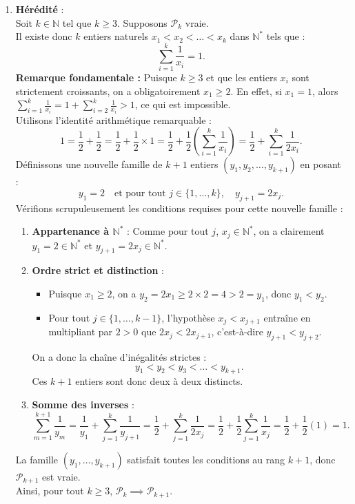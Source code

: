 \documentclass[11pt,a4paper]{article}
\newcommand{\N}{\mathbb{N}}
\begin{document}
\begin{correctionbox}
\begin{enumerate}[label=\textbf{\arabic*.}]
    \item \textbf{Hérédité} :\\
    Soit $k \in \N$ tel que $k \ge 3$. Supposons $\mathcal{P}_k$ vraie.\\
    Il existe donc $k$ entiers naturels $x_1 < x_2 < \dots < x_k$ dans $\N^*$ tels que :
    \[
    \sum_{i=1}^k \frac{1}{x_i} = 1.
    \]
    \textbf{Remarque fondamentale :} Puisque $k \ge 3$ et que les entiers $x_i$ sont strictement croissants, on a obligatoirement $x_1 \ge 2$. En effet, si $x_1 = 1$, alors $\sum_{i=1}^k \frac{1}{x_i} = 1 + \sum_{i=2}^k \frac{1}{x_i} > 1$, ce qui est impossible.\\
    Utilisons l'identité arithmétique remarquable :
    \[
    1 = \frac{1}{2} + \frac{1}{2} = \frac{1}{2} + \frac{1}{2} \times 1 = \frac{1}{2} + \frac{1}{2} \left(\sum_{i=1}^k \frac{1}{x_i}\right) = \frac{1}{2} + \sum_{i=1}^k \frac{1}{2x_i}.
    \]
    Définissons une nouvelle famille de $k+1$ entiers $(y_1, y_2, \dots, y_{k+1})$ en posant :
    \[
    y_1 = 2 \quad \text{et pour tout } j \in \{1, \dots, k\}, \quad y_{j+1} = 2x_j.
    \]
    Vérifions scrupuleusement les conditions requises pour cette nouvelle famille :
    \begin{enumerate}[label=(\alph*)]
        \item \textbf{Appartenance à $\N^*$} : Comme pour tout $j$, $x_j \in \N^*$, on a clairement $y_1 = 2 \in \N^*$ et $y_{j+1} = 2x_j \in \N^*$.
        \item \textbf{Ordre strict et distinction} :
        \begin{itemize}
            \item Puisque $x_1 \ge 2$, on a $y_2 = 2x_1 \ge 2 \times 2 = 4 > 2 = y_1$, donc $y_1 < y_2$.
            \item Pour tout $j \in \{1, \dots, k-1\}$, l'hypothèse $x_j < x_{j+1}$ entraîne en multipliant par $2 > 0$ que $2x_j < 2x_{j+1}$, c'est-à-dire $y_{j+1} < y_{j+2}$.
        \end{itemize}
        On a donc la chaîne d'inégalités strictes :
        \[
        y_1 < y_2 < y_3 < \dots < y_{k+1}.
        \]
        Ces $k+1$ entiers sont donc deux à deux distincts.
        \item \textbf{Somme des inverses} :
        \[
        \sum_{m=1}^{k+1} \frac{1}{y_m} = \frac{1}{y_1} + \sum_{j=1}^k \frac{1}{y_{j+1}} = \frac{1}{2} + \sum_{j=1}^k \frac{1}{2x_j} = \frac{1}{2} + \frac{1}{2} \sum_{j=1}^k \frac{1}{x_j} = \frac{1}{2} + \frac{1}{2}(1) = 1.
        \]
    \end{enumerate}
    La famille $(y_1, \dots, y_{k+1})$ satisfait toutes les conditions au rang $k+1$, donc $\mathcal{P}_{k+1}$ est vraie.\\
    Ainsi, pour tout $k \ge 3$, $\mathcal{P}_k \implies \mathcal{P}_{k+1}$.


\end{enumerate}
\end{correctionbox}
\end{document}

